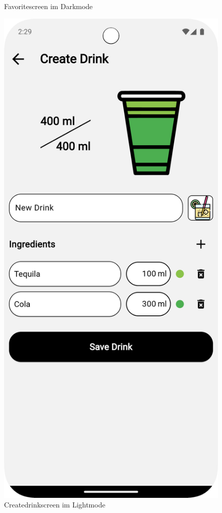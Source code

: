 \begin{figure}[h!]
\begin{minipage}{0.27\textwidth}
        \caption{Favoritescreen im Darkmode}
        \label{fig:favorites_dark}
    \end{minipage}
    \hfill
    \begin{minipage}{0.27\textwidth}
        \centering
        \includegraphics[width=\textwidth]{graphics/images/create_drink.png}
        \caption{Createdrinkscreen im Lightmode}
        \label{fig:favorites_dark}
    \end{minipage}
    \label{fig:favorites}
\end{figure}



